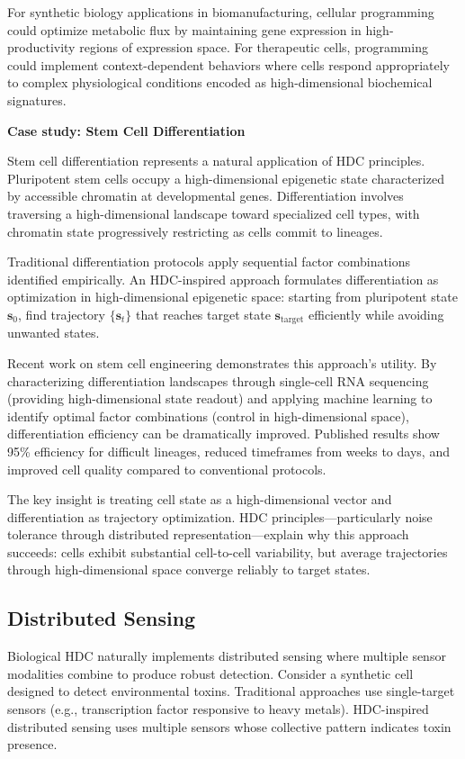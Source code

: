 \documentclass[12pt]{article}
\begin{document}
For synthetic biology applications in biomanufacturing, cellular programming could optimize metabolic flux by maintaining gene expression in high-productivity regions of expression space. For therapeutic cells, programming could implement context-dependent behaviors where cells respond appropriately to complex physiological conditions encoded as high-dimensional biochemical signatures.

\textbf{Case study: Stem Cell Differentiation}

Stem cell differentiation represents a natural application of HDC principles. Pluripotent stem cells occupy a high-dimensional epigenetic state characterized by accessible chromatin at developmental genes. Differentiation involves traversing a high-dimensional landscape toward specialized cell types, with chromatin state progressively restricting as cells commit to lineages.

Traditional differentiation protocols apply sequential factor combinations identified empirically. An HDC-inspired approach formulates differentiation as optimization in high-dimensional epigenetic space: starting from pluripotent state $\mathbf{s}_0$, find trajectory $\{\mathbf{s}_t\}$ that reaches target state $\mathbf{s}_{\text{target}}$ efficiently while avoiding unwanted states.

Recent work on stem cell engineering demonstrates this approach's utility. By characterizing differentiation landscapes through single-cell RNA sequencing (providing high-dimensional state readout) and applying machine learning to identify optimal factor combinations (control in high-dimensional space), differentiation efficiency can be dramatically improved. Published results show 95\% efficiency for difficult lineages, reduced timeframes from weeks to days, and improved cell quality compared to conventional protocols.

The key insight is treating cell state as a high-dimensional vector and differentiation as trajectory optimization. HDC principles—particularly noise tolerance through distributed representation—explain why this approach succeeds: cells exhibit substantial cell-to-cell variability, but average trajectories through high-dimensional space converge reliably to target states.

\subsection{Distributed Sensing}

Biological HDC naturally implements distributed sensing where multiple sensor modalities combine to produce robust detection. Consider a synthetic cell designed to detect environmental toxins. Traditional approaches use single-target sensors (e.g., transcription factor responsive to heavy metals). HDC-inspired distributed sensing uses multiple sensors whose collective pattern indicates toxin presence.
\end{document}
